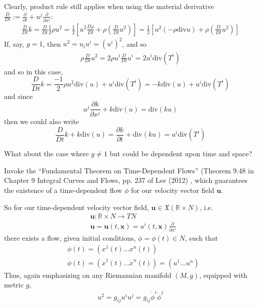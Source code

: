 \documentclass[10pt]{amsart}
\begin{document}
\begin{multicols*}{2}
\begin{enumerate}
Clearly, product rule still applies when using the material derivative $\frac{D}{Dt}:= \frac{ \partial }{ \partial t} + u^j \frac{ \partial }{ \partial x^j}$:
\[
\begin{gathered}
  \frac{D}{Dt} k =\frac{D}{Dt} \frac{1}{2} \rho u^2 = \frac{1}{2} \left[ u^2 \frac{D\rho }{Dt} + \rho \left( \frac{D}{Dt} u^2 \right)\right] = \frac{1}{2} \left[ u^2 (-\rho \text{div}u ) + \rho \left( \frac{D}{Dt} u^2 \right) \right]
\end{gathered}
\]
If, say, $g = 1$, then $u^2 = u_i u^i = (u^i)^2$, and so 
\[
\begin{gathered}
 \rho \frac{D}{Dt} u^2 = 2\rho u^i \frac{D}{Dt} u^i = 2 u^i \text{div}(T^i)
\end{gathered}
\]
and so in this case,
\[
\frac{D}{Dt} k = \frac{-1}{2} \rho u^2 \text{div}(u) + u^i \text{div}(T^i) = -k \text{div}(u) + u^i \text{div}(T^i)
\]
and since
\[
u^j \frac{ \partial k}{ \partial x^j} + k\text{div}(u) = \text{div}(ku)
\]
then we could also write
\[
\frac{D}{Dt}k + k \text{div}(u) = \frac{ \partial k}{ \partial t } + \text{div}(ku) = u^i \text{div}(T^i)
\]

What about the case where $g \neq 1$ but could be dependent upon time and space?  

Invoke the ``Fundamental Theorem on Time-Dependent Flows'' (Theorem 9.48 in Chapter 9 Integral Curves and Flows, pp. 237 of Lee (2012) \cite{JLee2012}, which guarantees the existence of a time-dependent flow $\phi$ for our velocity vector field $\mathbf{u}$.  

So for our time-dependent velocity vector field, $\mathbf{u} \in \mathfrak{X}(\mathbb{R}\times N)$, i.e.
\[
\begin{aligned}
  & \mathbf{u}: \mathbb{R} \times N \to TN \\
  & \mathbf{u} = \mathbf{u}(t,\mathbf{x}) = u^i(t,\mathbf{x}) \frac{ \partial }{ \partial x^i}
\end{aligned}
\]
there exists a flow, given initial conditions, $\phi = \phi(t) \in N$, such that 
\[
\begin{aligned}
  & \phi(t) = (x^1(t) \dots x^n(t) ) \\ 
  & \dot{\phi}(t) = (\dot{x}^1(t) \dots \dot{x}^n(t)) = (u^1 \dots u^n)
\end{aligned}
\]
Thus, again emphasizing on any Riemannian manifold $(M,g)$, equipped with metric $g$,
\[
u^2 = g_{ij} u^i u^j = g_{ij} \dot{\phi}^i \dot{\phi}^j
\]


\end{enumerate}
\end{multicols*}
\end{document}

